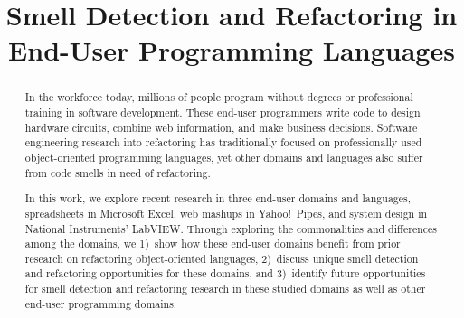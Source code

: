 \documentclass[10pt,conference,compsocconf]{IEEEtran}
\begin{document}
%
\title{Smell Detection and Refactoring in End-User Programming Languages}

\author{

\and
{}

\and
{}
}

\maketitle


\begin{abstract}
In the workforce today, millions of people program without degrees or professional training in software development. 
These end-user programmers write code to design hardware circuits, combine web information, and make business decisions. 
Software engineering research into refactoring has traditionally focused on professionally used object-oriented programming languages, 
yet other domains and languages also suffer from code smells in need of refactoring. 

In this work, we explore recent research in three end-user domains and languages, spreadsheets in Microsoft Excel, web mashups in Yahoo!\ Pipes, and system design in National Instruments' LabVIEW. 
Through exploring the commonalities and differences among the domains, we
1)~show how these end-user domains benefit from prior research on refactoring object-oriented languages,
2)~discuss unique smell detection and refactoring opportunities for these domains, and
3)~identify future opportunities for smell detection and refactoring research in these studied domains as well as other end-user programming domains. 
\end{abstract}
\end{document}
